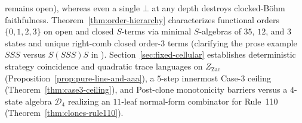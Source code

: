 \documentclass[11pt,reqno]{amsart}
\numberwithin{equation}{section}
\theoremstyle{plain}
\theoremstyle{definition}
\theoremstyle{remark}
\begin{document}
remains open), whereas even a single $\bot$ at any depth destroys clocked-B\"ohm faithfulness. Theorem~\ref{thm:order-hierarchy} characterizes functional orders $\{0,1,2,3\}$ on open and closed $S$-terms via minimal $S$-algebras of $35$, $12$, and $3$ states and unique right-comb closed order-$3$ terms (clarifying the prose example $S S S$ versus $S(S S S)S$ in \cite[p.~90]{BarendregtEndrullisKlopWaldmann2017}). Section~\ref{sec:fixed-cellular} establishes deterministic strategy coincidence and quadratic trace languages on $Z_{\mathrm{Zac}}$ (Proposition~\ref{prop:pure-line-and-aaa}), a $5$-step innermost Case-$3$ ceiling (Theorem~\ref{thm:case3-ceiling}), and Post-clone monotonicity barriers \cite{Post1941} versus a $4$-state algebra $\mathcal{D}_4$ realizing an $11$-leaf normal-form combinator for Rule~110 (Theorem~\ref{thm:clones-rule110}).
\end{document}
